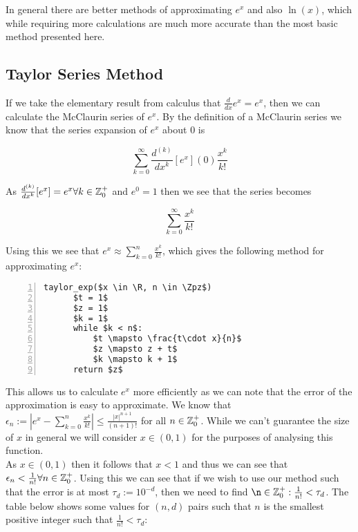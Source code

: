 In general there are better methods of approximating \(e^x\) and also \(\ln(x)\), which while requiring more calculations are much more accurate than the most basic method presented here.

\subsection{Taylor Series Method}

\theoremstyle{plain}
\newtheorem{nat log dif}{Proposition}[subsection]
\newtheorem{log convergence}[nat log dif]{Proposition}

If we take the elementary result from calculus that \(\frac{d}{dx}e^x = e^x\), then we can calculate the McClaurin series of \(e^x\). By the definition of a McClaurin series we know that the series expansion of \(e^x\) about 0 is 

\[\sum_{k=0}^\infty \frac{d^{(k)}}{dx^k}[e^x](0)\frac{x^k}{k!}\]

As \(\frac{d^{(k)}}{dx^k}[e^x] = e^x \forall k \in \mathbb{Z}^+_0\) and \(e^0 = 1\) then we see that the series becomes

\[\sum_{k=0}^\infty \frac{x^k}{k!}\]

Using this we see that \(e^x \approx \sum_{k=0}^n \frac{x^k}{k!}\), which gives the following method for approximating \(e^x\):

\begin{lstlisting}[numbers=left,frame=single,mathescape,caption={Taylor Method for calculating \(e^x\)},label={PCD_"taylor exp"}]
  taylor_exp($x \in \R, n \in \Zpz$)
      $t = 1$
      $z = 1$
      $k = 1$
      while $k < n$:
          $t \mapsto \frac{t\cdot x}{n}$
          $z \mapsto z + t$
          $k \mapsto k + 1$
      return $z$
\end{lstlisting}

This allows us to calculate \(e^x\) more efficiently as we can note that the error of the approximation is easy to approximate. We know that \(\epsilon_n := |e^x - \sum_{k=0}^n\frac{x^k}{k!}| \le \frac{|x|^{n+1}}{(n+1)!}\) for all \(n \in \mathbb{Z}^+_0\). While we can't guarantee the size of \(x\) in general we will consider \(x \in (0,1)\) for the purposes of analysing this function.\\

As \(x \in (0,1)\) then it follows that \(x < 1\) and thus we can see that \(\epsilon_n < \frac{1}{n!} \forall n \in \mathbb{Z}^+_0\). Using this we can see that if we wish to use our method such that the error is at most \(\tau_d := 10^{-d}\), then we need to find \(\n \in \Zpz : \frac{1}{n!} < \tau_d\). The table below shows some values for \((n, d)\) pairs such that \(n\) is the smallest positive integer such that \(\frac{1}{n!} < \tau_d\):

